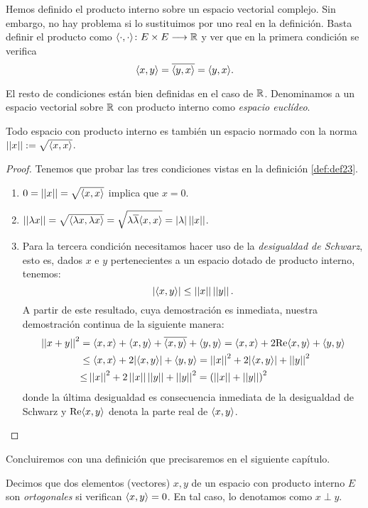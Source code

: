 \begin{observation} Hemos definido el producto interno sobre un espacio vectorial complejo. Sin embargo, no hay problema si lo sustituimos por uno real en la definición. Basta definir el producto como $\langle\cdot,\cdot\rangle\colon E\times E\longrightarrow \mathbb{R}$ y ver que en la primera condición se verifica
\[\langle x,y\rangle=\overline{\langle y,x\rangle}=\langle y,x\rangle.\]

El resto de condiciones están bien definidas en el caso de $\mathbb{R}$. Denominamos a un espacio vectorial sobre $\mathbb{R}$ con producto interno como \textit{espacio euclídeo}.
\end{observation}

\begin{proposition} Todo espacio con producto interno es también un espacio normado con la norma $\left|\left|x\right|\right|:=\sqrt{\langle x,x\rangle}$.
\begin{proof} Tenemos que probar las tres condiciones vistas en la definición \ref{def:def23}.
\begin{enumerate}[label=\alph*)]
\item $0 = \left|\left|x\right|\right| = \sqrt{\langle x,x\rangle}$ implica que $x=0$.
\item $\left|\left|\lambda x\right|\right| = \sqrt{\langle\lambda x,\lambda x\rangle} = \sqrt{\lambda\overline{\lambda}\langle x,x\rangle}=|\lambda|\left|\left|x\right|\right|$.
\item Para la tercera condición necesitamos hacer uso de la \textit{desigualdad de Schwarz}, esto es,  dados $x$ e $y$ pertenecientes a un espacio dotado de producto interno, tenemos:
$$|\langle x,y\rangle|\leq\left|\left|x\right|\right|\left|\left|y\right|\right|.
$$
A partir de este resultado, cuya demostración es inmediata, nuestra demostración continua de la siguiente manera:
\[
\begin{split}
\norm{x+y}^2 &= \dotproduct{x}{x} + \dotproduct{x}{y} + \overline{\dotproduct{x}{y}} + \dotproduct{y}{y} = \dotproduct{x}{x} + 2\mathrm{Re}\dotproduct{x}{y} + \dotproduct{y}{y}\\
&\leq \dotproduct{x}{x} + 2|\dotproduct{x}{y}| + \dotproduct{y}{y} = \norm{x}^2+ 2|\dotproduct{x}{y}|+\norm{y}^2\\
&%
{\leq}\norm{x}^2+ 2\norm{x}\norm{y}+\norm{y}^2 = \left(\norm{x}+\norm{y}\right)^2
\end{split}
\]
donde la última desigualdad es consecuencia inmediata de la desigualdad de Schwarz y $\mathrm{Re}\langle x,y\rangle$ denota la parte real de $\langle x,y\rangle$.
\end{enumerate}
\end{proof}
\end{proposition}

Concluiremos con una definición que precisaremos en el siguiente capítulo.

\begin{definition} Decimos que dos elementos (vectores) $x,y$ de un espacio con producto interno $E$ son \textit{ortogonales} si verifican $\langle x,y\rangle=0$. En tal caso, lo denotamos como $x\perp y$.
\end{definition}